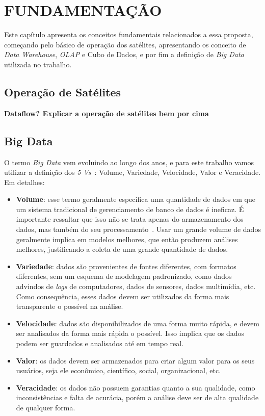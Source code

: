 
\chapter{FUNDAMENTAÇÃO}
\label{ch:fun}

{\color{red}
Este capítulo apresenta os conceitos fundamentais relacionados a essa proposta, começando pelo básico de operação dos satélites, apresentando os conceito de \textit{Data Warehouse}, \textit{OLAP} e Cubo de Dados, e por fim a definição de \textit{Big Data} utilizada no trabalho.
}

\section{Operação de Satélites}
\label{ch:fun:operations}

{\color{red}
\textbf{Dataflow? Explicar a operação de satélites bem por cima}
}

\section{Big Data}
\label{ch:fun:bigdata}

O termo \textit{Big Data} vem evoluindo ao longo dos anos, e para este trabalho vamos utilizar a definição dos \textit{5 Vs}~\cite{bimonteOpenIssuesBig2016}: Volume, Variedade, Velocidade, Valor e Veracidade. Em detalhes:

\begin{itemize}
	\item \textbf{Volume}: esse termo geralmente especifica uma quantidade de dados em que um sistema tradicional de gerenciamento de banco de dados é ineficaz.
É importante ressaltar que isso não se trata apenas do armazenamento dos dados, mas também do seu processamento~\cite{boussoufBigDataBased2018}.
Usar um grande volume de dados geralmente implica em modelos melhores, que então produzem análises melhores, justificando a coleta de uma grande quantidade de dados.
	\item \textbf{Variedade}: dados são provenientes de fontes diferentes, com formatos diferentes, sem um esquema de modelagem padronizado, como dados advindos de \textit{logs} de computadores, dados de sensores, dados multimídia, etc.
Como consequência, esses dados devem ser utilizados da forma mais transparente o possível na análise.
	\item \textbf{Velocidade}: dados são disponibilizados de uma forma muito rápida, e devem ser analisados da forma mais rápida o possível.
Isso implica que os dados podem ser guardados e analisados até em tempo real.
	\item \textbf{Valor}: os dados devem ser armazenados para criar algum valor para os seus usuários, seja ele econômico, científico, social, organizacional, etc.
	\item \textbf{Veracidade}: os dados não possuem garantias quanto a sua qualidade, como inconsistências e falta de acurácia, porém a análise deve ser de alta qualidade de qualquer forma.
\end{itemize}

